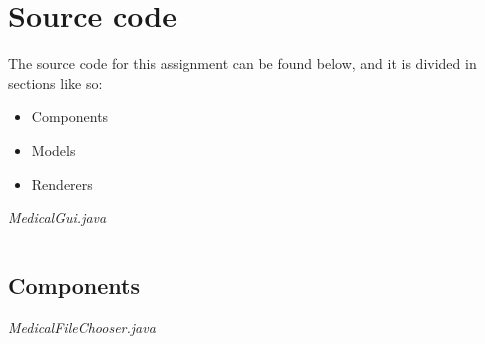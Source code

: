 \documentclass{article}
\begin{document}
\section{Source code}%
\label{sec:source_code}
The source code for this assignment can be found below, and it is divided in sections like so:
\begin{itemize}
  \item Components
  \item Models
  \item Renderers
\end{itemize}

\textit{MedicalGui.java}
\inputminted{java}{src/main/java/com/yvesstraten/medicalconsolegui/MedicalGui.java}

\subsection{Components}%
\label{subsec:components}

\textit{MedicalFileChooser.java}
\inputminted{java}{src/main/java/com/yvesstraten/medicalconsolegui/components/MedicalFileChooser.java}
\end{document}
